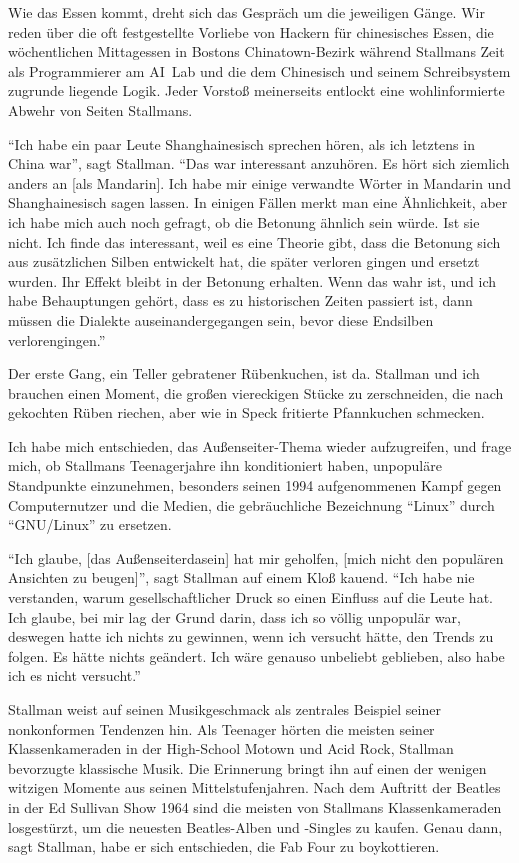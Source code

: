 Wie das Essen kommt, dreht sich das Gespräch um die jeweiligen Gänge. Wir reden über die oft festgestellte Vorliebe von Hackern für chinesisches Essen, die wöchentlichen Mittagessen in Bostons Chinatown-Bezirk während Stallmans Zeit als Programmierer am AI~Lab und die dem Chinesisch und seinem Schreibsystem zugrunde liegende Logik. Jeder Vorstoß meinerseits entlockt eine wohlinformierte Abwehr von Seiten Stallmans.

"`Ich habe ein paar Leute Shanghainesisch sprechen hören, als ich letztens in China war"', sagt Stallman. "`Das war interessant anzuhören. Es hört sich ziemlich anders an [als Mandarin]. Ich habe mir einige verwandte Wörter in Mandarin und Shanghainesisch sagen lassen. In einigen Fällen merkt man eine Ähnlichkeit, aber ich habe mich auch noch gefragt, ob die Betonung ähnlich sein würde. Ist sie nicht. Ich finde das interessant, weil es eine Theorie gibt, dass die Betonung sich aus zusätzlichen Silben entwickelt hat, die später verloren gingen und ersetzt wurden. Ihr Effekt bleibt in der Betonung erhalten. Wenn das wahr ist, und ich habe Behauptungen gehört, dass es zu historischen Zeiten passiert ist, dann müssen die Dialekte auseinandergegangen sein, bevor diese Endsilben verlorengingen."'

Der erste Gang, ein Teller gebratener Rübenkuchen, ist da. Stallman und ich brauchen einen Moment, die großen viereckigen Stücke zu zerschneiden, die nach gekochten Rüben riechen, aber wie in Speck fritierte Pfannkuchen schmecken.

Ich habe mich entschieden, das Außenseiter-Thema wieder aufzugreifen, und frage mich, ob Stallmans Teenagerjahre ihn konditioniert haben, unpopuläre Standpunkte einzunehmen, besonders seinen 1994 aufgenommenen Kampf gegen Computernutzer und die Medien, die gebräuchliche Bezeichnung "`Linux"' durch "`GNU/Linux"' zu ersetzen.

"`Ich glaube, [das Außenseiterdasein] hat mir geholfen, [mich nicht den populären Ansichten zu beugen]"', sagt Stallman auf einem Kloß kauend. "`Ich habe nie verstanden, warum gesellschaftlicher Druck so einen Einfluss auf die Leute hat. Ich glaube, bei mir lag der Grund darin, dass ich so völlig unpopulär war, deswegen hatte ich nichts zu gewinnen, wenn ich versucht hätte, den Trends zu folgen. Es hätte nichts geändert. Ich wäre genauso unbeliebt geblieben, also habe ich es nicht versucht."'

Stallman weist auf seinen Musikgeschmack als zentrales Beispiel seiner nonkonformen Tendenzen hin. Als Teenager hörten die meisten seiner Klassenkameraden in der High-School Motown und Acid Rock, Stallman bevorzugte klassische Musik. Die Erinnerung bringt ihn auf einen der wenigen witzigen Momente aus seinen Mittelstufenjahren. Nach dem Auftritt der Beatles in der Ed Sullivan Show 1964 sind die meisten von Stallmans Klassenkameraden losgestürzt, um die neuesten Beatles-Alben und -Singles zu kaufen. Genau dann, sagt Stallman, habe er sich entschieden, die Fab Four zu boykottieren.

